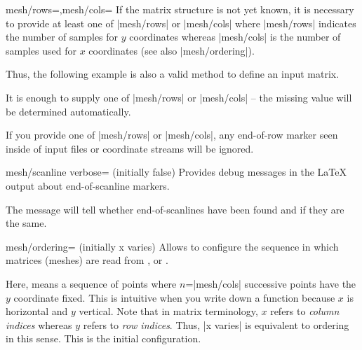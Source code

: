{\begin{pgfplotskeylist}{mesh/rows=,mesh/cols=}
    If the matrix structure is not yet known, it is necessary to provide at
    least one of |mesh/rows| or |mesh/cols| where |mesh/rows| indicates the
    number of samples for $y$ coordinates whereas |mesh/cols| is the number of
    samples used for $x$ coordinates (see also |mesh/ordering|).

    Thus, the following example is also a valid method to define an input
    matrix.
\begin{codeexample}[]
\end{codeexample}

    It is enough to supply one of |mesh/rows| or |mesh/cols| -- the missing
    value will be determined automatically.

    If you provide one of |mesh/rows| or |mesh/cols|, any end-of-row marker
    seen inside of input files or coordinate streams will be ignored.
\end{pgfplotskeylist}

\begin{pgfplotskeylist}{mesh/scanline verbose= (initially false)}
    Provides debug messages in the \LaTeX{} output about end-of-scanline
    markers.

    The message will tell whether end-of-scanlines have been found and if they
    are the same.
\end{pgfplotskeylist}

\begin{pgfplotskey}{mesh/ordering= (initially x varies)}
    Allows to configure the sequence in which matrices (meshes) are read from
    ,  or
    .

    Here,  means a sequence of points where
    $n$=|mesh/cols| successive points have the $y$ coordinate fixed. This is
    intuitive when you write down a function because $x$ is horizontal and $y$
    vertical. Note that in matrix terminology, $x$ refers to \emph{column
    indices} whereas $y$ refers to \emph{row indices}. Thus, |x varies| is
    equivalent to  ordering in this sense. This is the
    initial configuration.


\end{pgfplotskey}}
